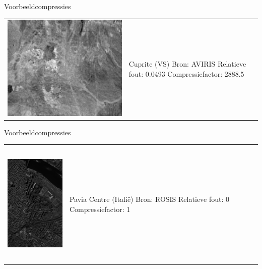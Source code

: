 \documentclass[t,12pt,dutch
\ifx\beamermode\undefined\else,\beamermode\fi
]{beamer}
\begin{document}
\begin{frame}{Voorbeeldcompressies}

\begin{table}[H]
\centering
\begin{tabular}{C{0.6\textwidth}  L{0.4\textwidth}}
\includegraphics[width=\linewidth]{images/example_compression_Cuprite_0_05.png}
&
Cuprite (VS)\newline
Bron: AVIRIS\newline
\vspace{5mm}
Relatieve fout: 0.0493
Compressiefactor: 2888.5
\end{tabular}
\end{table}

\end{frame}

\begin{frame}{Voorbeeldcompressies}

\begin{table}[H]
\centering
\begin{tabular}{C{0.6\textwidth}  L{0.4\textwidth}}
\includegraphics[height=6cm]{images/pavia_sum.png}
&
Pavia Centre (Itali\"e)\newline
Bron: ROSIS\newline
\vspace{5mm}
Relatieve fout: 0
Compressiefactor: 1
\end{tabular}
\end{table}

\end{frame}
\end{document}
